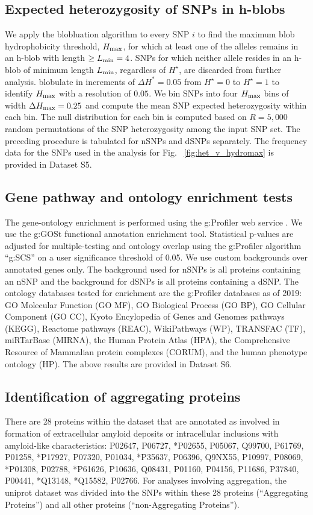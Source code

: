 \documentclass[9pt,twocolumn,twoside,lineno]{pnas-new}
\newcommand{\cmax}{H_{\rm max}}
\newcommand{\Ht}{H^{\star}}
\newcommand{\Lmin}{L_{\rm min}}
\begin{document}
\subsection*{Expected heterozygosity of SNPs in h-blobs}
We apply the blobluation algorithm to every SNP $i$ to find the maximum blob hydrophobicity threshold, $\cmax$, for which at least one of the alleles remains in an h-blob with length $\geq \Lmin=4$. SNPs for which neither allele resides in an h-blob of minimum length $\Lmin$, regardless of $\Ht$, are discarded from further analysis. blobulate in increments of $\Delta H^* = 0.05$ from $\Ht=0$ to $\Ht=1$ to identify $\cmax$ with a resolution of $0.05$. We bin SNPs into four $\cmax$ bins of width $\Delta \cmax = 0.25$ and compute the mean SNP expected heterozygosity within each bin. The null distribution for each bin is computed based on $R=5,000$ random permutations of the SNP heterozygosity among the input SNP set. The preceding procedure is tabulated for nSNPs and dSNPs separately. The frequency data for the SNPs used in the analysis for Fig. ~\ref{fig:het_v_hydromax} is provided in Dataset S5.

\subsection*{Gene pathway and ontology enrichment tests}
The gene-ontology enrichment is performed using the g:Profiler web service \cite{Raudvere2019}. We use the g:GOSt functional annotation enrichment tool. Statistical p-values are adjusted for multiple-testing and ontology overlap using the g:Profiler algorithm ``g:SCS'' on a user significance threshold of 0.05. We use custom backgrounds over annotated genes only. The background used for nSNPs is all proteins containing an nSNP and the background for dSNPs is all proteins containing a dSNP. The ontology databases tested for enrichment are the g:Profiler databases as of 2019: GO Molecular Function (GO MF), GO Biological Process (GO BP), GO Cellular Component (GO CC), Kyoto Encylopedia of Genes and Genomes pathways (KEGG), Reactome pathways (REAC), WikiPathways (WP), TRANSFAC (TF), miRTarBase (MIRNA), the Human Protein Atlas (HPA), the Comprehensive Resource of Mammalian protein complexes (CORUM), and the human phenotype ontology (HP). The above results are provided in Dataset S6.

\subsection*{Identification of aggregating proteins}
There are 28 proteins within the dataset that are annotated as involved in formation of extracellular amyloid deposits or intracellular inclusions with amyloid-like characteristics: P02647, P06727, *P02655, P05067, Q99700, P61769, P01258, *P17927, P07320, P01034, *P35637, P06396, Q9NX55, P10997, P08069, *P01308, P02788, *P61626, P10636, Q08431, P01160, P04156, P11686, P37840, P00441, *Q13148, *Q15582, P02766. For analyses involving aggregation, the uniprot dataset was divided into the SNPs within these 28 proteins (``Aggregating Proteins'') and all other proteins (``non-Aggregating Proteins''). 
\end{document}
